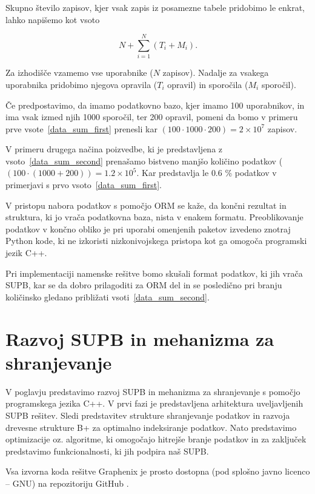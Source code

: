 \documentclass[a4paper,12pt,openright]{book}
\begin{document}
    \noindent
    Skupno število zapisov, kjer vsak zapis iz posamezne tabele pridobimo le enkrat, lahko napišemo kot vsoto

    \begin{equation}
        N + \sum_{i=1}^{N} (T_i + M_i).
    \label{data_sum_second}
    \end{equation}

    \noindent
    Za izhodišče vzamemo vse uporabnike ($N$ zapisov). Nadalje za vsakega uporabnika pridobimo njegova opravila ($T_i$ opravil) in sporočila ($M_i$ sporočil).
    
    Če predpostavimo, da imamo podatkovno bazo, kjer imamo \num{100} uporabnikov, in ima vsak izmed njih \num{1000} sporočil, ter \num{200} opravil, pomeni da bomo v primeru prve vsote~\eqref{data_sum_first} prenesli kar $(100 \cdot 1000 \cdot 200) = 2 \times 10^7$ zapisov.

    V primeru drugega načina poizvedbe, ki je predstavljena z vsoto~\eqref{data_sum_second} prenašamo bistveno manjšo količino podatkov ($(100 \cdot (1000 + 200)) = 1.2 \times 10^5$. Kar predstavlja le $0.6$ \% podatkov v primerjavi s prvo vsoto~\eqref{data_sum_first}.

    V pristopu nabora podatkov s pomočjo ORM se kaže, da končni rezultat in struktura, ki jo vrača podatkovna baza, nista v enakem formatu. Preoblikovanje podatkov v končno obliko je pri uporabi omenjenih paketov izvedeno znotraj Python kode, ki ne izkoristi nizkonivojskega pristopa kot ga omogoča programski jezik C++.

    Pri implementaciji namenske rešitve bomo skušali format podatkov, ki jih vrača SUPB, kar se da dobro prilagoditi za ORM del in se posledično pri branju količinsko gledano približati vsoti~\eqref{data_sum_second}.

\chapter{Razvoj SUPB in mehanizma za shranjevanje}
\label{ch0}
    V poglavju predstavimo razvoj SUPB in mehanizma za shranjevanje s pomočjo programskega jezika C++. V prvi fazi je predstavljena arhitektura uveljavljenih SUPB rešitev. Sledi predstavitev strukture shranjevanje podatkov in razvoja drevesne strukture B+ za optimalno indeksiranje podatkov. Nato predstavimo optimizacije oz. algoritme, ki omogočajo hitrejše branje podatkov in za zaključek predstavimo funkcionalnosti, ki jih podpira naš SUPB.

    Vsa izvorna koda rešitve Graphenix je prosto dostopna (pod splošno javno licenco – GNU) na repozitoriju GitHub \cite{GRAPHENIX_GITHUB}.
\end{document}
